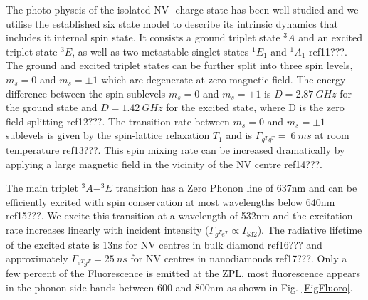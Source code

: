 \documentclass[preprint,prl]{revtex4}
\begin{document}
The photo-physcis of the isolated NV- charge state has been well studied and we utilise the established six state model to describe its intrinsic dynamics that includes it internal spin state. It consists a ground triplet state $^3A$ and an excited triplet state $^3E$, as well as two metastable singlet states $^1E_1$ and $^1A_1$ ref11???. The ground and excited triplet states can be further split into three spin levels, $m_s=0$ and $m_s=\pm1$ which are degenerate at zero magnetic field. The energy difference between the spin sublevels $m_s=0$ and $m_s=\pm1$ is $D=\SI{2.87}{GHz}$ for the ground state and $D=\SI{1.42}{GHz}$ for the excited state, where D is the zero field splitting ref12???. The transition rate between $m_s=0$ and $m_s=\pm1$ sublevels is given by the spin-lattice relaxation $T_1$ and is $\Gamma_{g^Tg^T} = ~\SI{6}{ms}$ at room temperature ref13???. This spin mixing rate can be increased dramatically by applying a large magnetic field in the vicinity of the NV centre ref14???.

The main triplet $^3A-^3E$ transition has a Zero Phonon line of 637nm and can be efficiently excited with spin conservation at most wavelengths below 640nm ref15???. We excite this transition at a wavelength of 532nm and the excitation rate increases linearly with incident intensity ($\Gamma_{g^Te^T} \propto I_{532}$). The radiative lifetime of the excited state is 13ns for NV centres in bulk diamond ref16??? and approximately $\Gamma_{e^Tg^T} = \SI{25}{ns}$ for NV centres in nanodiamonds ref17???. Only a few percent of the Fluorescence is emitted at the ZPL, most fluorescence appears in the phonon side bands between 600 and 800nm as shown in Fig. \ref{FigFluoro}.
\end{document}
